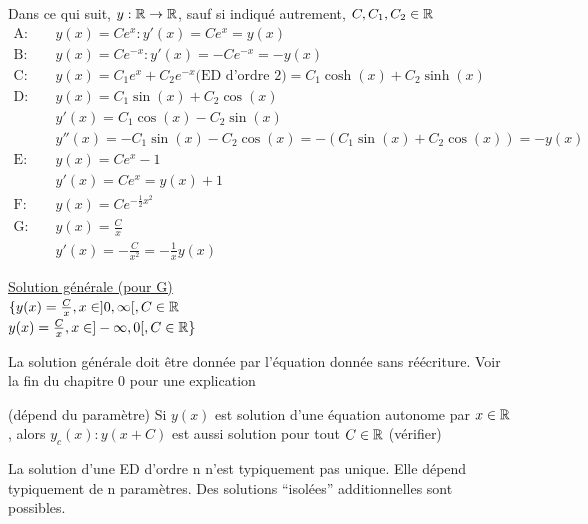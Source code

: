 \documentclass[12pt,a4paper]{article}
\begin{document}
 Dans ce qui suit, $y : \R \to \R$, sauf si indiqué autrement, $C,C_1,C_2 \in \R$\\
$\begin{array}{lll}
\text{A: }& &y(x) = Ce^x : y'(x) =Ce^x = y(x)\\
\text{B: }& &y(x) = Ce^{-x} : y'(x) = -Ce^{-x} = -y(x)\\
\text{C: }& &y(x) = C_1e^x + C_2e^{-x} \text{(ED d'ordre 2)} =C_1\cosh(x) + C_2\sinh(x)\\
\text{D: }& &y(x) = C_1\sin(x) + C_2\cos(x)\\
	&	&y'(x) = C_1\cos(x) -C_2\sin(x)\\
	&	&y''(x) = -C_1\sin(x) - C_2\cos(x) =-(C_1\sin(x) + C_2\cos(x)) = -y(x)\\
\text{E: }& & y(x) = Ce^x -1\\
	&	&y'(x) = Ce^x = y(x) + 1\\
\text{F: }& & y(x) = Ce^{-\frac{1}{2}x^2}\\
\text{G: }& & y(x) = \frac{C}{x}\\
	&	&y'(x) = -\frac{C}{x^2} = -\frac{1}{x}y(x)

\end{array}$

\underline{Solution générale (pour G)}\\
$\{y(x) = \frac{C}{x}, x \in ]0,\infty[, C \in \mathbb{R}$\\
$y(x) = \frac{C}{x}, x\in ]-\infty,0[, C\in\mathbb{R}\}$\\
\begin{boite}
	La solution générale doit être donnée par l'équation donnée sans réécriture. Voir la fin du chapitre 0 pour une explication
\end{boite}
\begin{boite}
	 (dépend du paramètre) Si $y(x)$ est solution d'une équation autonome par $x\in \mathbb{R}$, alors $y_c(x) : y(x+C)$ est aussi solution pour tout $C \in \mathbb{R}$ (vérifier)
\end{boite}
\begin{boite}
	 La solution d'une ED d'ordre n n'est typiquement pas unique. Elle dépend typiquement de n paramètres. Des solutions \enquote{isolées} additionnelles sont possibles. 
\end{boite}
\end{document}

